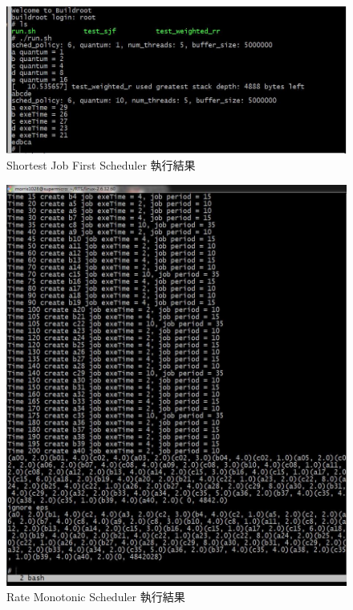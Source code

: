 \documentclass{res}
\begin{document}
\begin{resume}
\begin{figure}[htp]
    \begin{center}
        \includegraphics[width=400pt]{images/exp-sjf.jpg}
        \caption{Shortest Job First Scheduler 執行結果}
        \label{fig: result}
    \end{center}
\end{figure}

\vspace*{.1in} 

\begin{figure}[htp]
    \begin{center}
        \includegraphics[width=400pt]{images/exp-rms.jpg}
        \caption{Rate Monotonic Scheduler 執行結果}
        \label{fig: result}
    \end{center}
\end{figure}



\vspace*{.1in} 

\end{resume}
\end{document}
